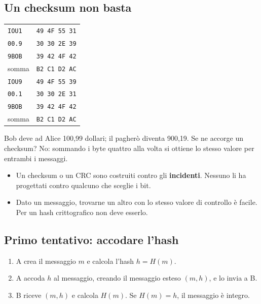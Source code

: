 \subsection{Un checksum non basta}

\begin{minipage}{0.4\linewidth}
\centering\small
\begin{tabular}{ll}
\toprule
\texttt{IOU1} & \texttt{49 4F 55 31} \\
\texttt{00.9} & \texttt{30 30 2E 39} \\
\texttt{9BOB} & \texttt{39 42 4F 42} \\
somma & \texttt{B2 C1 D2 AC} \\
\midrule
\texttt{IOU9} & \texttt{49 4F 55 39} \\
\texttt{00.1} & \texttt{30 30 2E 31} \\
\texttt{9BOB} & \texttt{39 42 4F 42} \\
somma & \texttt{B2 C1 D2 AC} \\
\bottomrule
\end{tabular}
\end{minipage}\hfill
\begin{minipage}{0.56\linewidth}
Bob deve ad Alice 100,99 dollari; il pagherò diventa 900,19. Se ne accorge un checksum? No: sommando i byte quattro alla volta si
ottiene lo stesso valore per entrambi i messaggi.
\begin{itemize}
    \item Un checksum o un CRC sono costruiti contro gli \textbf{incidenti}. Nessuno li ha progettati contro qualcuno che sceglie i bit.
    \item Dato un messaggio, trovarne un altro con lo stesso valore di controllo è facile. Per un hash crittografico non deve esserlo.
\end{itemize}
\end{minipage}

\subsection{Primo tentativo: accodare l'hash}

\begin{enumerate}
    \item A crea il messaggio $m$ e calcola l'hash $h = H(m)$.
    \item A accoda $h$ al messaggio, creando il messaggio esteso $(m, h)$, e lo invia a B.
    \item B riceve $(m, h)$ e calcola $H(m)$. Se $H(m) = h$, il messaggio è integro.
\end{enumerate}


